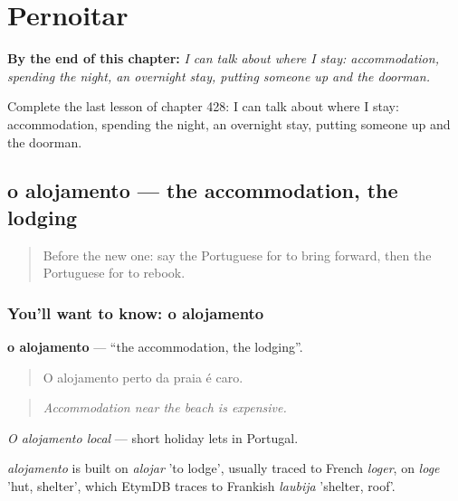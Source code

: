 
\chapter{Pernoitar}
\label{ch:pt-pernoitar}

\begin{chapteropening}
\textbf{By the end of this chapter:} \emph{I can talk about where I stay: accommodation, spending the night, an overnight stay, putting someone up and the doorman.}

Complete the last lesson of chapter 428: I can talk about where I stay: accommodation, spending the night, an overnight stay, putting someone up and the doorman.
\end{chapteropening}

\section[o alojamento]{o alojamento — the accommodation, the lodging}

\label{lesson:PT-C428-alojamento}



\begin{quote}
Before the new one: say the Portuguese for to bring forward, then the Portuguese for to rebook.
\end{quote}

\subsection*{You'll want to know: o alojamento}
\textbf{o alojamento} — \textquotedblleft{}the accommodation, the lodging\textquotedblright{}.

\begin{quote}
O alojamento perto da praia é caro.
\end{quote}

\begin{quote}
\emph{Accommodation near the beach is expensive.}
\end{quote}

\emph{O alojamento local} — short holiday lets in Portugal.

\begin{cousinweb}
\emph{alojamento} is built on \emph{alojar} 'to lodge', usually traced to French \emph{loger}, on \emph{loge} 'hut, shelter', which EtymDB traces to Frankish \emph{laubija} 'shelter, roof'.
\end{cousinweb}

